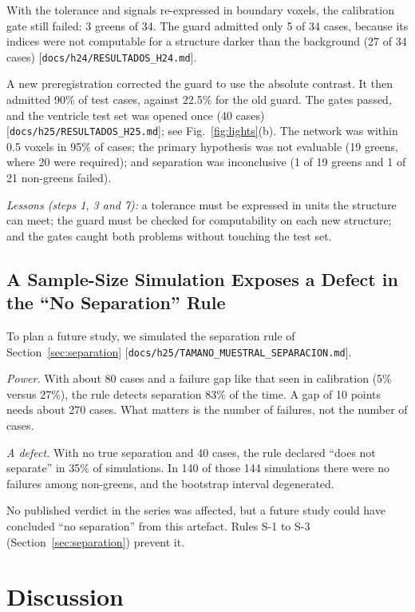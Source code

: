 \documentclass[journal,twoside]{IEEEtran}
\newcommand{\repo}[1]{[\nolinkurl{#1}]}   %
\begin{document}
With the tolerance and signals re-expressed in boundary voxels, the calibration gate still failed: 3 greens of 34.
The guard admitted only 5 of 34 cases, because its indices were not computable for a structure darker than the
background (27 of 34 cases) \repo{docs/h24/RESULTADOS_H24.md}.

A new preregistration corrected the guard to use the absolute contrast. It then admitted 90\% of test cases, against
22.5\% for the old guard. The gates passed, and the ventricle test set was opened once (40 cases)
\repo{docs/h25/RESULTADOS_H25.md}; see Fig.~\ref{fig:lights}(b). The network was within 0.5 voxels in 95\% of cases;
the primary hypothesis was not evaluable (19 greens, where 20 were required); and separation was inconclusive (1 of
19 greens and 1 of 21 non-greens failed).

\emph{Lessons (steps 1, 3 and 7):} a tolerance must be expressed in units the structure can meet; the guard must be
checked for computability on each new structure; and the gates caught both problems without touching the test set.

\subsection{A Sample-Size Simulation Exposes a Defect in the ``No Separation'' Rule}\label{sec:exE}
To plan a future study, we simulated the separation rule of Section~\ref{sec:separation}
\repo{docs/h25/TAMANO_MUESTRAL_SEPARACION.md}.

\emph{Power.} With about 80 cases and a failure gap like that seen in calibration (5\% versus 27\%), the rule detects
separation 83\% of the time. A gap of 10 points needs about 270 cases. What matters is the number of failures, not
the number of cases.

\emph{A defect.} With no true separation and 40 cases, the rule declared ``does not separate'' in 35\% of
simulations. In 140 of those 144 simulations there were no failures among non-greens, and the bootstrap interval
degenerated.

No published verdict in the series was affected, but a future study could have concluded ``no separation'' from this
artefact. Rules S-1 to S-3 (Section~\ref{sec:separation}) prevent it.

\section{Discussion}\label{sec:discussion}
\end{document}
